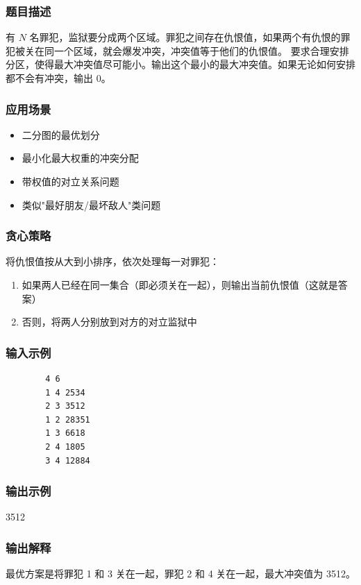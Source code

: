\documentclass[12pt,a4paper]{ctexart}
\begin{document}
	\subsubsection*{题目描述}
	有 $N$ 名罪犯，监狱要分成两个区域。罪犯之间存在仇恨值，如果两个有仇恨的罪犯被关在同一个区域，就会爆发冲突，冲突值等于他们的仇恨值。  
	要求合理安排分区，使得最大冲突值尽可能小。输出这个最小的最大冲突值。如果无论如何安排都不会有冲突，输出 0。
	
	\subsubsection*{应用场景}
	\begin{itemize}
		\item 二分图的最优划分
		\item 最小化最大权重的冲突分配
		\item 带权值的对立关系问题
		\item 类似"最好朋友/最坏敌人"类问题
	\end{itemize}
	
	\subsubsection*{贪心策略}
	将仇恨值按从大到小排序，依次处理每一对罪犯：
	\begin{enumerate}
		\item 如果两人已经在同一集合（即必须关在一起），则输出当前仇恨值（这就是答案）
		\item 否则，将两人分别放到对方的对立监狱中
	\end{enumerate}
	
	\subsubsection*{输入示例}
	\begin{verbatim}
		4 6
		1 4 2534
		2 3 3512
		1 2 28351
		1 3 6618
		2 4 1805
		3 4 12884
	\end{verbatim}
	
	\subsubsection*{输出示例}
	3512
	
	\subsubsection*{输出解释}
	最优方案是将罪犯 1 和 3 关在一起，罪犯 2 和 4 关在一起，最大冲突值为 3512。
	
\end{document}

